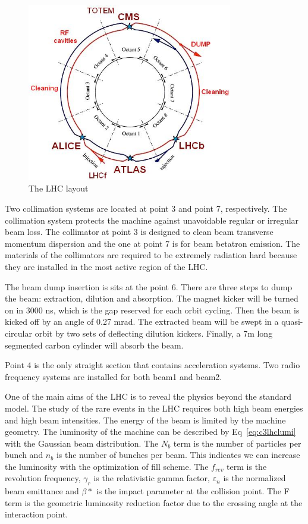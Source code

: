 \begin{figure}[htbp]
 \begin{center}
  \includegraphics[width=0.8\textwidth]{figures/c3/c3_lhc_latticelayout.jpg}
 \end{center}
 \caption{The LHC layout}
 \label{fig:c3lhclayout}
\end{figure}

Two collimation systems\cite{Assmann:691766} are located at point 3 and point 7, respectively. The collimation system protects the machine against unavoidable regular or irregular beam loss. The collimator at point 3 is designed to clean beam transverse momentum dispersion and the one at point 7 is for beam betatron emission. The materials of the collimators are required to be extremely radiation hard because they are installed in the most active region of the LHC. 

The beam dump insertion is sits at the point 6. There are three steps to dump the beam: extraction, dilution and absorption. The magnet kicker will be turned on in 3000 ns, which is the gap reserved for each orbit cycling. Then the beam is kicked off by an angle of 0.27 mrad. The extracted beam will be swept in a quasi-circular orbit by two sets of deflecting dilution kickers. Finally, a 7m long segmented carbon cylinder will absorb the beam.

Point 4 is the only straight section that contains acceleration systems. Two radio frequency systems are installed for both beam1 and beam2. 

One of the main aims of the LHC is to reveal the physics beyond the standard model. The study of the rare events in the LHC requires both high beam energies and high beam intensities. The energy of the beam is limited by the machine geometry. The luminosity of the machine can be described by Eq~\ref{eq:c3lhclumi} with the Gaussian beam distribution. The $N_{b}$ term is the number of particles per bunch and $n_{b}$ is the number of bunches per beam. This indicates we can increase the luminosity with the optimization of fill scheme. The $f_{rev}$ term is the revolution frequency, $\gamma_{r}$ is the relativistic gamma factor, $\varepsilon_{n}$ is the normalized beam emittance and $\beta *$ is the impact parameter at the collision point. The F term is the geometric luminosity reduction factor due to the crossing angle at the interaction point. 

